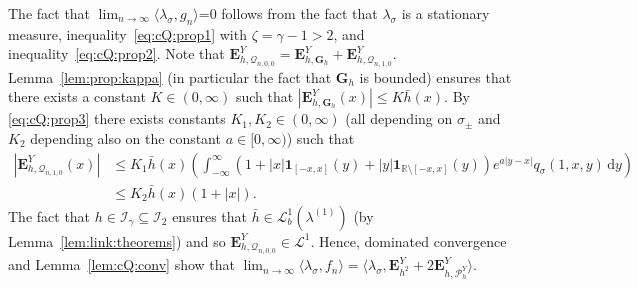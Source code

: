 \documentclass[12pt]{article}
\numberwithin{equation}{section}
\theoremstyle{definition}
\theoremstyle{remark}
\newcommand{\RR}{\mathbb{R}}
\newcommand{\cQ}{\mathcal{Q}}
\newcommand{\ind}[1]{\mathbf{1}_{#1}}
\newcommand{\vd}{\,\mathrm{d}}
\newcommand{\Lone}{\mathcal{L}^1}
\newcommand{\Lgb}[1]{\mathcal{L}^{1}_{b}(\lambda^{(#1)})}
\newcommand{\Lg}[1]{\mathcal{I}_{#1}}
\newcommand{\bfH}[1]{\mathbf{E}^Y_{#1}}
\newcommand{\bfG}[1]{\mathbf{G}_{#1}}
\begin{document}
The fact that $\lim_{n\to\infty} \langle \lambda_\sigma , g_n \rangle$=0 follows from the fact that $\lambda_\sigma$ is a stationary measure, inequality~\eqref{eq:cQ:prop1} with $\zeta=\gamma-1 >2$, and inequality~\eqref{eq:cQ:prop2}.
%
Note that
$
	\bfH{h, \cQ_{n,0,0}}= \bfH{h, \bfG{h}}+\bfH{h, \cQ_{n,1,0}}.
$
Lemma~\ref{lem:prop:kappa} (in particular the fact that $\bfG{h}$ is bounded) ensures that there exists a constant $K\in (0,\infty)$ 
such that
$
	|\bfH{h, \bfG{h}}(x)| 
	\leq K \bar h(x) .
$
By \eqref{eq:cQ:prop3} 
there exists constants $K_1,K_2\in (0,\infty)$ (all depending on $\sigma_\pm$ and $K_2$ depending also on the constant $a\in [0,\infty)$) such that
\begin{equation}
\begin{split}
	|\bfH{h, \cQ_{n,1,0}}(x)| 
	& 
	\leq K_1 \bar h(x) \left(  \int_{-\infty}^\infty  (1+|x| \ind{[-x,x]}(y)+ |y| \ind{\RR\setminus[-x,x]}(y)) e^{a |y-x|} q_\sigma (1,x,y) \vd y \right)
	\\
	& 
	\leq K_2 \bar h(x) (1+|x|). 	 
\end{split}
\end{equation} 
The fact that $h\in \Lg{\gamma}\subseteq \Lg{2}$ ensures that $\bar h \in \Lgb{1}$ (by Lemma~\ref{lem:link:theorems}) and so $\bfH{h, \cQ_{n,0,0}} 
\in \Lone$. 
Hence, dominated convergence and Lemma~\ref{lem:cQ:conv} show that 
$
	\lim_{n\to\infty}\langle \lambda_\sigma , f_n \rangle=\langle \lambda_\sigma , \bfH {h^2} + 2 \bfH{h, \mathcal{P}_{h}^{Y} } \rangle
$.
\end{document}
